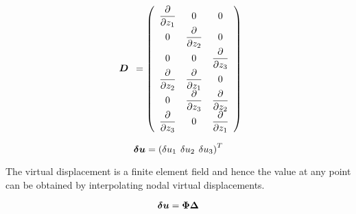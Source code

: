 \begin{equation}
  \begin{array}{c} \matr{D} \end{array} =
  \pbrac{ \begin{array}{ccc} \delby{}{z_{1}} & 0 & 0 \\ 
      0 & \delby{}{z_{2}} & 0 \\
      0 & 0 & \delby{}{z_{3}} \\
      \delby{}{z_{2}} & \delby{}{z_{1}} & 0 \\ 
      0 & \delby{}{z_{3}} & \delby{}{z_{2}} \\ 
      \delby{}{z_{3}} & 0 & \delby{}{z_{1}} \\ \end{array} }
  \label{eqn:differentialoperator}
\end{equation}

\begin{equation}
  \vect{\delta u}=\transpose{\pbrac{\delta u_{1} \hspace{4 pt} \delta u_{2} \hspace{4 pt} \delta u_{3}}}
  \label{eqn:displacementvector}
\end{equation}

The virtual displacement is a finite element field and hence the value at any
point can be obtained by interpolating nodal virtual displacements.

\begin{equation}
  \vect{\delta u}=\matr{\Phi}\matr{\Delta}
  \label{eqn:interpolation}
\end{equation}

